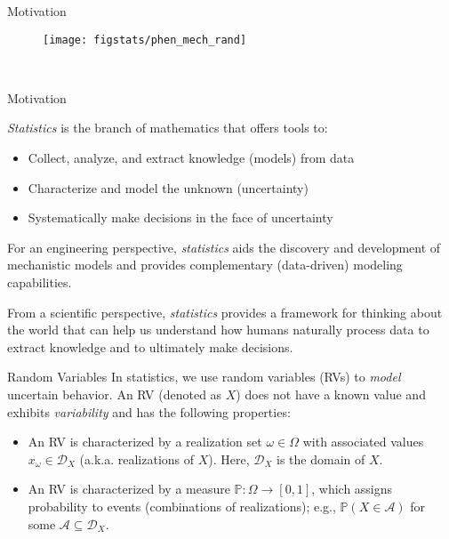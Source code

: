 \documentclass[9pt]{beamer}
\begin{document}
\begin{frame}{Motivation}



\begin{figure}[!htb]
    \centering
	\texttt{[image: figstats/phen\_mech\_rand]}
\end{figure}
\
\end{frame}


%
\begin{frame}{Motivation}

{\em Statistics} is the branch of mathematics that offers tools to: 
\begin{itemize}
\item Collect, analyze, and extract knowledge (models) from data 
\item Characterize and model the unknown (uncertainty) 
\item Systematically make decisions in the face of uncertainty
\end{itemize}

\begin{block}{}
For an engineering perspective, {\em statistics} aids the discovery and development of mechanistic models and provides complementary (data-driven) modeling capabilities.  
\end{block}

\begin{block}{}
From a scientific perspective, {\em statistics} provides a framework for thinking about the world that can help us understand how humans naturally process data to extract knowledge and to ultimately make decisions. 
\end{block}
\end{frame}


\begin{frame}{Random Variables}
In statistics, we use random variables (RVs) to {\em model} uncertain behavior. An RV (denoted as $X$) does not have a known value and exhibits {\em variability} and has the following properties: 
\begin{block}{}
\begin{itemize}
\item An RV is characterized by a realization set $\omega \in \Omega$ with associated values $x_\omega\in \mathcal{D}_X$ (a.k.a. realizations of $X$).  Here, $\mathcal{D}_X$ is the domain of $X$.
\item An RV is characterized by a measure $\mathbb{P}:\Omega\to [0,1]$, which assigns probability to events (combinations of realizations); e.g., $\mathbb{P}(X\in \mathcal{A})$ for some $\mathcal{A}\subseteq \mathcal{D}_X$.
\end{itemize}
\end{block}
\end{frame}
\end{document}
